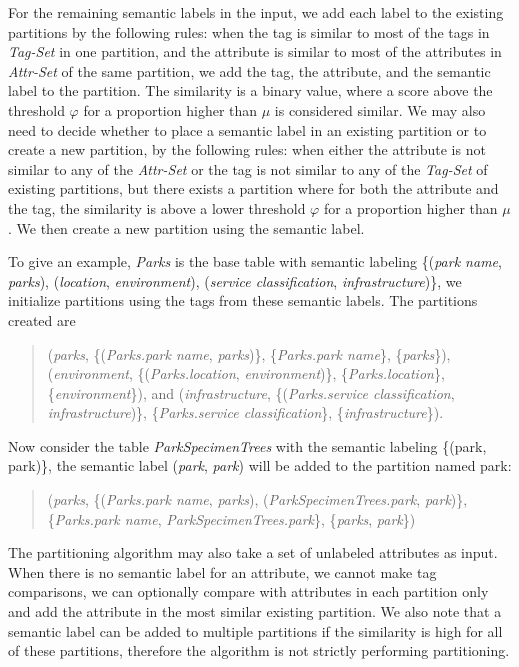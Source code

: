 For the remaining semantic labels in the input, we add each label to the existing partitions by the following rules: when the tag is similar to most of the tags in \textit{Tag-Set} in one partition, and the attribute is similar to most of the attributes in \textit{Attr-Set} of the same partition, we add the tag, the attribute, and the semantic label to the partition. The similarity is a binary value, where a score above the threshold $\varphi$ for a proportion higher than $\mu$ is considered similar. We may also need to decide whether to place a semantic label in an existing partition or to create a new partition, by the following rules: when either the attribute is not similar to any of the \textit{Attr-Set} or the tag is not similar to any of the \textit{Tag-Set} of existing partitions, but there exists a partition where for both the attribute and the tag, the similarity is above a lower threshold $\varphi$ for a proportion higher than $\mu$. We then create a new partition using the semantic label.

To give an example, \textit{Parks} is the base table with semantic labeling \{(\textit{park name}, \textit{parks}), (\textit{location}, \textit{environment}), (\textit{service classification}, \textit{infrastructure})\}, we initialize partitions using the tags from these semantic labels. The partitions created are
\begin{quote}
(\textit{parks}, \{(\textit{Parks.park name}, \textit{parks})\}, \{\textit{Parks.park name}\}, \{\textit{parks}\}),
(\textit{environment}, \{(\textit{Parks.location}, \textit{environment})\}, \{\textit{Parks.location}\}, \{\textit{environment}\}), and
(\textit{infrastructure}, \{(\textit{Parks.service classification}, \textit{infrastructure})\}, \{\textit{Parks.service classification}\}, \{\textit{infrastructure}\}).
\end{quote}

Now consider the table \textit{ParkSpecimenTrees} with the semantic labeling \{(park, park)\}, the semantic label (\textit{park}, \textit{park}) will be added to the partition named park:
\begin{quote}
(\textit{parks}, \{(\textit{Parks.park name}, \textit{parks}), (\textit{ParkSpecimenTrees.park}, \textit{park})\}, \{\textit{Parks.park name}, \textit{ParkSpecimenTrees.park}\}, \{\textit{parks}, \textit{park}\})
\end{quote}

The partitioning algorithm may also take a set of unlabeled attributes as input. When there is no semantic label for an attribute, we cannot make tag comparisons, we can optionally compare with attributes in each partition only and add the attribute in the most similar existing partition. We also note that a semantic label can be added to multiple partitions if the similarity is high for all of these partitions, therefore the algorithm is not strictly performing partitioning.
\endinput